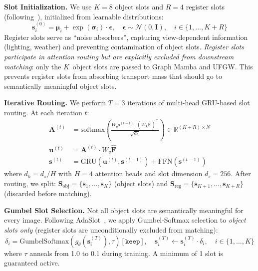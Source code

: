 \documentclass{article}
\newcommand{\R}{\mathbb{R}}
\begin{document}
\textbf{Slot Initialization.}
We use $K = 8$ object slots and $R = 4$ register slots (following~\cite{registers}), initialized from learnable distributions:
\begin{equation}
    \mathbf{s}_i^{(0)} = \boldsymbol{\mu}_i + \exp(\boldsymbol{\sigma}_i) \cdot \boldsymbol{\epsilon}, \quad \boldsymbol{\epsilon} \sim \mathcal{N}(0, \mathbf{I}), \quad i \in \{1, \ldots, K+R\}
\end{equation}
Register slots serve as ``noise absorbers'', capturing view-dependent information (lighting, weather) and preventing contamination of object slots. \textit{Register slots participate in attention routing but are explicitly excluded from downstream matching}: only the $K$~object slots are passed to Graph Mamba and UFGW. This prevents register slots from absorbing transport mass that should go to semantically meaningful object slots.

\textbf{Iterative Routing.}
We perform $T=3$ iterations of multi-head GRU-based slot routing. At each iteration $t$:
\begin{align}
    \mathbf{A}^{(t)} &= \text{softmax}\!\left(\frac{W_q \mathbf{s}^{(t-1)} \cdot (W_k \hat{\mathbf{F}})^\top}{\sqrt{d_h}}\right) \in \R^{(K+R) \times N} \\
    \mathbf{u}^{(t)} &= \mathbf{A}^{(t)} \cdot W_v \hat{\mathbf{F}} \\
    \mathbf{s}^{(t)} &= \text{GRU}(\mathbf{u}^{(t)}, \mathbf{s}^{(t-1)}) + \text{FFN}(\mathbf{s}^{(t-1)})
\end{align}
where $d_h = d_s / H$ with $H=4$ attention heads and slot dimension $d_s = 256$. After routing, we split: $\mathbf{S}_{\text{obj}} = \{\mathbf{s}_1, \ldots, \mathbf{s}_K\}$ (object slots) and $\mathbf{S}_{\text{reg}} = \{\mathbf{s}_{K+1}, \ldots, \mathbf{s}_{K+R}\}$ (discarded before matching).

\textbf{Gumbel Slot Selection.}
Not all object slots are semantically meaningful for every image. Following AdaSlot~\cite{adaslot}, we apply Gumbel-Softmax selection to \textit{object slots only} (register slots are unconditionally excluded from matching):
\begin{equation}
    \delta_i = \text{GumbelSoftmax}(g_\theta(\mathbf{s}_i^{(T)}), \tau)[\texttt{keep}], \quad \mathbf{s}_i^{(T)} \leftarrow \mathbf{s}_i^{(T)} \cdot \delta_i, \quad i \in \{1, \ldots, K\}
\end{equation}
where $\tau$ anneals from 1.0 to 0.1 during training. A minimum of 1 slot is guaranteed active.
\end{document}
